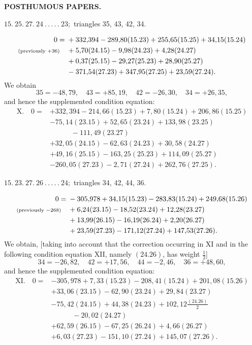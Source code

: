 \newpage
{}\hfill\textbf{POSTHUMOUS PAPERS.}
\begin{center}
$15.\ 25.\ 27.\ 24\ .\,.\,.\,.\,.\ 23;$ triangles 35, 43, 42, 34.
\end{center}
\[
\begin{aligned}
0={}&+332{,}394-289{,}80(15.23)+255{,}65(15.25)+34{,}15(15.24)\\
\text{\scriptsize(previously $+36$)}\quad&+5{,}70(24.15)-9{,}98(24.23)+4{,}28(24.27)\\
&+0{,}37(25.15)-29{,}27(25.23)+28{,}90(25.27)\\
&-371{,}54(27.23)+347{,}95(27.25)+23{,}59(27.24).
\end{aligned}
\]
We obtain
\[
35=-48{,}79,\quad43=+85{,}19,\quad42=-26{,}30,\quad34=+26{,}35,
\]
and hence the supplemented condition equation:
\[
\begin{aligned}
\mathrm{X.}\quad0={}&+332{,}394-214{,}66(15.23)+7{,}80(15.24)+206{,}86(15.25)\\
&-75{,}14(23.15)+52{,}65(23.24)+133{,}98(23.25)\\
&\qquad\quad-111{,}49(23.27)\\
&+32{,}05(24.15)-62{,}63(24.23)+30{,}58(24.27)\\
&+49{,}16(25.15)-163{,}25(25.23)+114{,}09(25.27)\\
&-260{,}05(27.23)-2{,}71(27.24)+262{,}76(27.25).
\end{aligned}
\]

\par\bigskip
\begin{center}
$15.\ 23.\ 27.\ 26\ .\,.\,.\,.\,.\ 24;$ triangles 34, 42, 44, 36.
\end{center}
\[
\begin{aligned}
0={}&-305{,}978+34{,}15(15.23)-283{,}83(15.24)+249{,}68(15.26)\\
\text{\scriptsize(previously $-268$)}\quad&+6{,}24(23.15)-18{,}52(23.24)+12{,}28(23.27)\\
&+13{,}99(26.15)-16{,}19(26.24)+2{,}20(26.27)\\
&+23{,}59(27.23)-171{,}12(27.24)+147{,}53(27.26).
\end{aligned}
\]
We obtain, [taking into account that the correction occurring in XI and in
the following condition equation XII, namely \((24.26)\), has
weight \(\frac{1}{2}\)]
\[
34=-26{,}82,\quad42=+17{,}56,\quad44=-2{,}46,\quad36=+48{,}60,
\]
and hence the supplemented condition equation:
\[
\begin{aligned}
\mathrm{XI.}\quad0={}&-305{,}978+7{,}33(15.23)-208{,}41(15.24)+201{,}08(15.26)\\
&+33{,}06(23.15)-62{,}90(23.24)+29{,}84(23.27)\\
&-75{,}42(24.15)+44{,}38(24.23)+102{,}12\frac{(24.26)}{2}\\
&\qquad\quad-20{,}02(24.27)\\
&+62{,}59(26.15)-67{,}25(26.24)+4{,}66(26.27)\\
&+6{,}03(27.23)-151{,}10(27.24)+145{,}07(27.26).
\end{aligned}
\]

